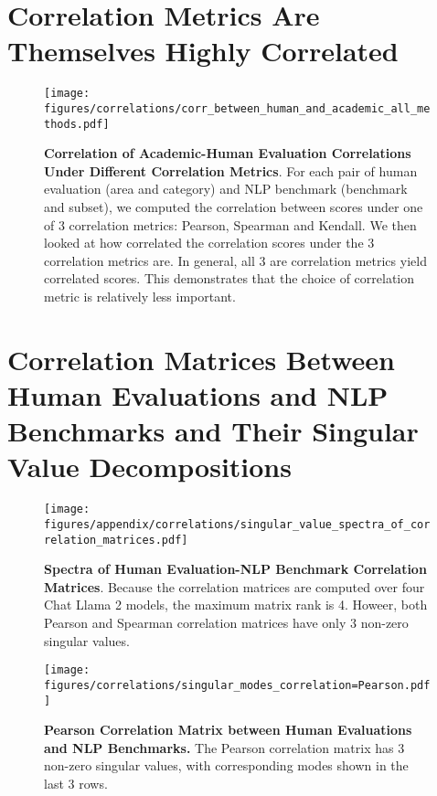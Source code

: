 \clearpage
\section{Correlation Metrics Are Themselves Highly Correlated}
\label{app:sec:comparison_of_correlation_methods}

\begin{figure}[h!]
    \centering
    \texttt{[image: figures/correlations/corr\_between\_human\_and\_academic\_all\_methods.pdf]}
    \caption{\textbf{Correlation of Academic-Human Evaluation Correlations Under Different Correlation Metrics}. For each pair of human evaluation (area and category) and NLP benchmark (benchmark and subset), we computed the correlation between scores under one of 3 correlation metrics: Pearson, Spearman and Kendall. We then looked at how correlated the correlation scores under the 3 correlation metrics are. In general, all 3 are correlation metrics yield correlated scores. This demonstrates that the choice of correlation metric is relatively less important.}
    \label{app:fig:correlation_couplings}
\end{figure}

\clearpage
\section{Correlation Matrices Between Human Evaluations and NLP Benchmarks and Their Singular Value Decompositions}
\label{app:sec:full_correlation_matrices}

\begin{figure}[h!]
    \centering
    \texttt{[image: figures/appendix/correlations/singular\_value\_spectra\_of\_correlation\_matrices.pdf]}
    \caption{\textbf{Spectra of Human Evaluation-NLP Benchmark Correlation Matrices}. Because the correlation matrices are computed over four Chat Llama 2 models, the maximum matrix rank is 4. Howeer, both Pearson and Spearman correlation matrices have only 3 non-zero singular values.}
    \label{app:fig:academic_human_singular_value_spectra}
\end{figure}

\clearpage



\begin{figure}
    \centering
    \texttt{[image: figures/correlations/singular\_modes\_correlation=Pearson.pdf]}
    \caption{\textbf{Pearson Correlation Matrix between Human Evaluations and NLP Benchmarks.} The Pearson correlation matrix has 3 non-zero singular values, with corresponding modes shown in the last 3 rows.}
    \label{app:fig:pearson_correlation}
\end{figure}

